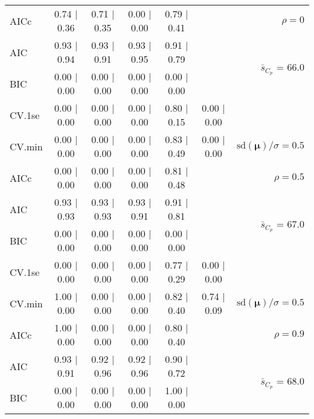 \documentclass[12pt]{article}
\newcommand{\mr}[1]{\mathrm{#1}}
\newcommand{\bm}[1]{\mathbf{#1}}
\begin{document}
\begin{table}[p]
\begin{center}
\begin{tabular}{l*{5}{c}|r}
AICc & 0.74 $\mid$ 0.36 & 0.71 $\mid$ 0.35 & 0.00 $\mid$ 0.00 & 0.79 $\mid$ 0.41 & & $\rho=0$ \\
AIC & 0.93 $\mid$ 0.94 & 0.93 $\mid$ 0.91 & 0.93 $\mid$ 0.95 & 0.91 $\mid$ 0.79 & & \multirow{2}{*}{$\bar{s}_{C_p}$ = 66.0} \\
BIC & 0.00 $\mid$ 0.00 & 0.00 $\mid$ 0.00 & 0.00 $\mid$ 0.00 & 0.00 $\mid$ 0.00 & & \\
 \hline 
CV.1se & 0.00 $\mid$ 0.00 & 0.00 $\mid$ 0.00 & 0.00 $\mid$ 0.00 & 0.80 $\mid$ 0.15 & 0.00 $\mid$ 0.00 &\\
CV.min & 0.00 $\mid$ 0.00 & 0.00 $\mid$ 0.00 & 0.00 $\mid$ 0.00 & 0.83 $\mid$ 0.49 & 0.00 $\mid$ 0.00 &  $\mr{sd}(\bm{\mu})/\sigma=0.5$ \\
AICc & 0.00 $\mid$ 0.00 & 0.00 $\mid$ 0.00 & 0.00 $\mid$ 0.00 & 0.81 $\mid$ 0.48 & & $\rho=0.5$ \\
AIC & 0.93 $\mid$ 0.93 & 0.93 $\mid$ 0.93 & 0.93 $\mid$ 0.91 & 0.91 $\mid$ 0.81 & & \multirow{2}{*}{$\bar{s}_{C_p}$ = 67.0} \\
BIC & 0.00 $\mid$ 0.00 & 0.00 $\mid$ 0.00 & 0.00 $\mid$ 0.00 & 0.00 $\mid$ 0.00 & & \\
 \hline 
CV.1se & 0.00 $\mid$ 0.00 & 0.00 $\mid$ 0.00 & 0.00 $\mid$ 0.00 & 0.77 $\mid$ 0.29 & 0.00 $\mid$ 0.00 &\\
CV.min & 1.00 $\mid$ 0.00 & 0.00 $\mid$ 0.00 & 0.00 $\mid$ 0.00 & 0.82 $\mid$ 0.40 & 0.74 $\mid$ 0.09 &  $\mr{sd}(\bm{\mu})/\sigma=0.5$ \\
AICc & 1.00 $\mid$ 0.00 & 0.00 $\mid$ 0.00 & 0.00 $\mid$ 0.00 & 0.80 $\mid$ 0.40 & & $\rho=0.9$ \\
AIC & 0.93 $\mid$ 0.91 & 0.92 $\mid$ 0.96 & 0.92 $\mid$ 0.96 & 0.90 $\mid$ 0.72 & & \multirow{2}{*}{$\bar{s}_{C_p}$ = 68.0} \\
BIC & 0.00 $\mid$ 0.00 & 0.00 $\mid$ 0.00 & 0.00 $\mid$ 0.00 & 1.00 $\mid$ 0.00 & & \\
 \hline 
 \end{tabular}
\end{center}
\vspace{-1cm}
\end{table}
\end{document}
